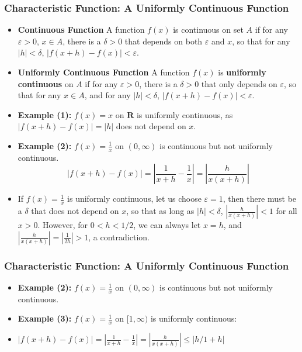 \documentclass[handout]{beamer}
\begin{document}
\frame
{
  \frametitle{Characteristic Function: A Uniformly Continuous Function} 

   \begin{itemize}
          
                     
                                          \item<1-> \textbf{Continuous Function} A function $f(x)$ is continuous on set $A$ if for any $\varepsilon>0$, $x\in A$, there is a $\delta>0$ that depends on both $\varepsilon$ and $x$, so that for any $|h|<\delta$, $|f(x+h)-f(x)|<\varepsilon$.


                     \item<2-> \textbf{Uniformly Continuous Function} A function $f(x)$ is {\bf uniformly continuous} on $A$ if for any $\varepsilon>0$, there is a $\delta>0$ that only depends on $\varepsilon$, so that for any $x\in A$, and for any $|h|<\delta$, $|f(x+h)-f(x)|<\varepsilon.$
                     
                         \item<4-> \textbf{Example (1): }  $f(x)=x$ on $\mathbf{R}$ is uniformly continuous, as $|f(x+h)-f(x)|=|h|$ does not depend on $x$. 
                         
                     
                     \item<3-> \textbf{Example (2):}  $f(x)=\frac{1}{x}$ on $(0, \infty)$ is continuous but not uniformly continuous. 
                     $$|f(x+h)-f(x)|=|\frac{1}{x+h}-\frac{1}{x}|=|\frac{h}{x(x+h)}|$$
                     
                     \item<4->[-] If $f(x)=\frac{1}{x}$ is uniformly continuous, let us choose $\varepsilon=1$, then there must be a $\delta$ that does not depend on $x$, so that as long as $|h|<\delta$, $|\frac{h}{x(x+h)}|<1$ for all $x>0$. However, for $0<h<1/2$, we can always let $x=h$, and $|\frac{h}{x(x+h)}|=|\frac{1}{2h}|>1$, a contradiction. 
                     
                     
                                                                                                   
                                               \end{itemize}
}

\frame
{
  \frametitle{Characteristic Function: A Uniformly Continuous Function} 

   \begin{itemize}
                     
	\item<1-> \textbf{Example (2):}  $f(x)=\frac{1}{x}$ on $(0, \infty)$ is continuous but not uniformly continuous. 


	\item<2-> \textbf{Example (3):}  $f(x)=\frac{1}{x}$ on $[1, \infty)$ is uniformly continuous: 
                     
	\item<3->  $|f(x+h)-f(x)|=|\frac{1}{x+h}-\frac{1}{x}|=|\frac{h}{x(x+h)}| \le |h/1+h|$                                                                
                                               \end{itemize}
}
\end{document}
